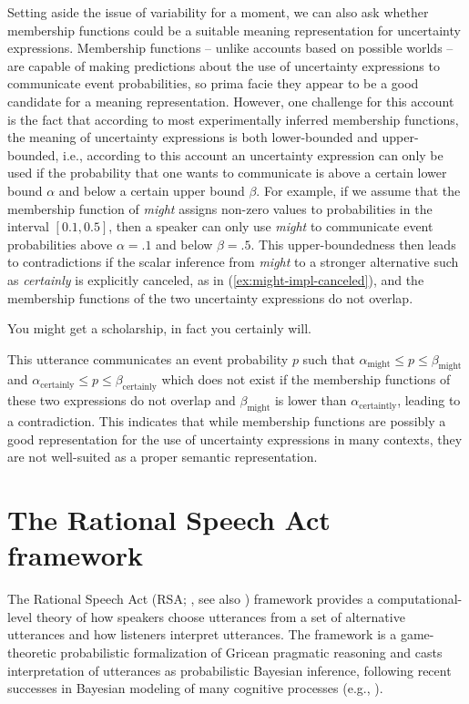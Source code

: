 Setting aside the issue of variability for a moment, we can also ask whether membership functions could be a suitable 
meaning representation for uncertainty expressions. Membership functions -- unlike accounts based on possible worlds --
are capable of making predictions about the use of uncertainty expressions to communicate event probabilities, so prima facie
they appear to be a good candidate for a meaning representation. However, one challenge for this account is the fact that
according to most experimentally inferred membership functions, the meaning of uncertainty expressions is both lower-bounded and upper-bounded,
i.e., according to this account an uncertainty expression can only be used if the probability that one wants to communicate is above a certain lower 
bound $\alpha$ and below a certain upper bound $\beta$. For example, if we assume that the membership function of \textit{might} assigns
non-zero values to probabilities in the interval $[ 0.1,0.5 ]$, then a speaker can only use \textit{might} to communicate event probabilities above 
$\alpha=.1$ and  below $\beta=.5$. This upper-boundedness then leads to contradictions if the scalar inference from \textit{might} to a stronger 
alternative such as \textit{certainly} is explicitly canceled, as in (\ref{ex:might-impl-canceled}), and the membership functions of the two 
uncertainty expressions do not overlap.
\begin{exe}
\ex \label{ex:might-impl-canceled} You might get a scholarship, in fact you certainly will. 
\end{exe}   
This utterance communicates an event probability $p$ such that $\alpha_{\mbox{might}} \le p \le \beta_{\mbox{might}}$ and 
$\alpha_{\mbox{certainly}} \le p \le \beta_{\mbox{certainly}}$ which does not exist if the membership functions of these two expressions
do not overlap and  $\beta_{\mbox{might}}$  is lower than $\alpha_{\mbox{certaintly}}$, leading to a contradiction. This indicates that while
membership functions are possibly a good representation for the use of uncertainty expressions in many contexts, they are not well-suited
as a proper semantic representation. 



\section{The Rational Speech Act framework}

The Rational Speech Act (RSA; \cite{GoodmanFrank2016}, see also \cite{FrankeJaeger2016}) framework provides a computational-level
theory of how speakers choose utterances from a set of alternative utterances and how listeners interpret utterances. The framework is
a game-theoretic probabilistic formalization of Gricean \cite{Grice1975} pragmatic reasoning and casts interpretation of utterances as probabilistic Bayesian
inference, following recent successes in Bayesian modeling of many cognitive processes (e.g., \cite{TenenbaumGrowingAMind}). 

